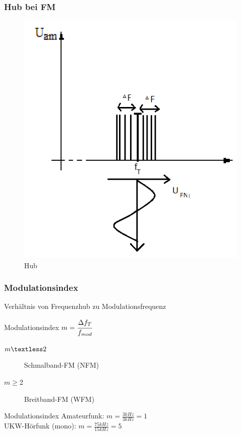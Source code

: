 \begin{frame}
  \frametitle{Hub bei FM}
  \begin{center}
    \begin{figure}
      \includegraphics[width=\textwidth,height=.75\textheight,keepaspectratio]{e14/Hub.png}
      \caption{Hub}  %
    \end{figure}
  \end{center}
\end{frame}

\begin{frame}
  \frametitle{Modulationsindex}
  Verhältnis von Frequenzhub zu Modulationsfrequenz
  \begin{block}{Modulationsindex}
    $m = \cfrac{\Delta f_T}{f_{mod}}$
  \end{block}
  \begin{description}
    \item[$m\textless2$] Schmalband-FM (NFM)
    \item[$m\geq$2] Breitband-FM (WFM)
  \end{description}
  \begin{exampleblock}{Modulationsindex}
    Amateurfunk: $m = \frac{3kHz}{3kHz} = 1$\\
    UKW-Hörfunk (mono): $m = \frac{75kHz}{15kHz} = 5$\\
  \end{exampleblock}
\end{frame}

